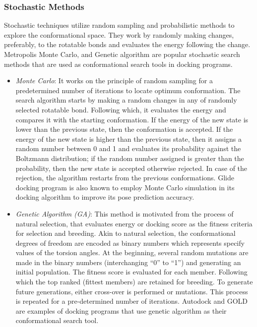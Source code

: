 \subsubsection*{Stochastic Methods}
Stochastic techniques utilize random sampling and probabilistic methods to explore the conformational space. They work by randomly making changes, preferably, to the rotatable bonds and evaluates the energy following the change. Metropolis Monte Carlo, and Genetic algorithm are popular stochastic search methods that are used as conformational search tools in docking programs. 

\begin{itemize}
    \item \textit{Monte Carlo}: It works on the principle of random sampling for a predetermined number of iterations to locate optimum conformation. The search algorithm starts by making a random changes in any of randomly selected rotatable bond. Following which, it evaluates the energy and compares it with the starting conformation. If the energy of the new state is lower than the previous state, then the conformation is accepted. If the energy of the new state is higher than the previous state, then it assigns a random number between 0 and 1 and evaluates its probability against the Boltzmann distribution; if the random number assigned is greater than the probability, then the new state is accepted otherwise rejected. In case of the rejection, the algorithm restarts from the previous conformations. Glide\cite{bib15} docking program is also known to employ Monte Carlo simulation in its docking algorithm to improve its pose prediction accuracy.
   
    \item \textit{Genetic Algorithm (GA)}: This method\cite{bib20, bib21} is motivated from the process of natural selection, that evaluates energy or docking score as the fitness criteria for selection and breeding. Akin to natural selection, the conformational degrees of freedom are encoded as binary numbers which represents specify values of the torsion angles. At the beginning, several random mutations are made in the binary numbers (interchanging “0” to “1”) and generating an initial population. The fitness score is evaluated for each member. Following which the top ranked (fittest members) are retained for breeding. To generate future generations, either cross-over is performed or mutations. This process is repeated for a pre-determined number of iterations. Autodock\cite{bib22} and GOLD\cite{bib20} are examples of docking programs that use genetic algorithm as their conformational search tool.
\end{itemize}   


